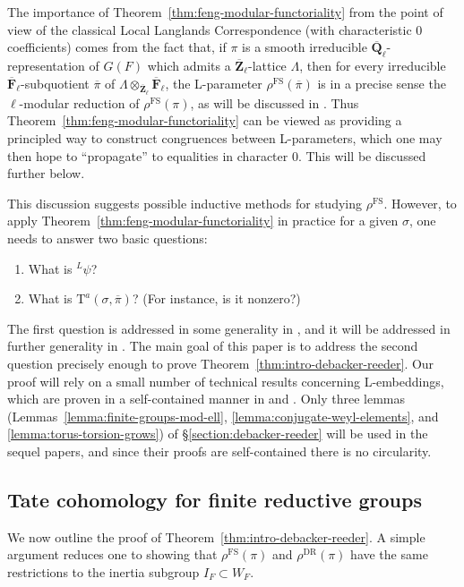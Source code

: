 \documentclass[reqno]{amsart}
\numberwithin{equation}{subsection}
\newcommand{\F}{\mathbf{F}}
\newcommand{\Q}{\mathbf{Q}}
\newcommand{\Z}{\mathbf{Z}}
\newcommand{\ol}[1]{\overline{#1}}
\newcommand{\ld}{{}^L}
\DeclareMathOperator{\FS}{FS}
\DeclareMathOperator{\DR}{DR}
\newcommand{\rT}{\ensuremath{\mathrm{T}}\xspace}
\theoremstyle{remark}
\numberwithin{equation}{subsection}
\numberwithin{figure}{subsection}
\begin{document}
The importance of Theorem~\ref{thm:feng-modular-functoriality} from the point of view of the classical Local Langlands Correspondence (with characteristic $0$ coefficients) comes from the fact that, if $\pi$ is a smooth irreducible $\ol\Q_\ell$-representation of $G(F)$ which admits a $\ol\Z_\ell$-lattice $\Lambda$, then for every irreducible $\ol\F_\ell$-subquotient $\ol\pi$ of $\Lambda \otimes_{\ol\Z_\ell} \ol\F_\ell$, the L-parameter $\rho^{\FS}(\ol\pi)$ is in a precise sense the $\ell$-modular reduction of $\rho^{\FS}(\pi)$, as will be discussed in \cite[\S 9.1]{CF26b}. Thus Theorem~\ref{thm:feng-modular-functoriality} can be viewed as providing a principled way to construct congruences between L-parameters, which one may then hope to ``propagate'' to equalities in character $0$. This will be discussed further below.

This discussion suggests possible inductive methods for studying $\rho^{\FS}$. However, to apply Theorem~\ref{thm:feng-modular-functoriality} in practice for a given $\sigma$, one needs to answer two basic questions:
\begin{enumerate}
    \item What is $\ld\psi$?
    \item What is $\rT^a(\sigma, \ol\pi)$? (For instance, is it nonzero?)
\end{enumerate}
The first question is addressed in some generality in \cite[Proposition~10.2.1]{F24}, and it will be addressed in further generality in \cite{CF26b}. The main goal of this paper is to address the second question precisely enough to prove Theorem~\ref{thm:intro-debacker-reeder}. Our proof will rely on a small number of technical results concerning L-embeddings, which are proven in a self-contained manner in \cite{CF26a} and \cite{CF26b}. Only three lemmas (Lemmas~\ref{lemma:finite-groups-mod-ell}, \ref{lemma:conjugate-weyl-elements}, and \ref{lemma:torus-torsion-grows}) of \S\ref{section:debacker-reeder} will be used in the sequel papers, and since their proofs are self-contained there is no circularity.

\subsection{Tate cohomology for finite reductive groups}

We now outline the proof of Theorem~\ref{thm:intro-debacker-reeder}. A simple argument reduces one to showing that $\rho^{\FS}(\pi)$ and $\rho^{\DR}(\pi)$ have the same restrictions to the inertia subgroup $I_F \subset W_F$.
\end{document}
